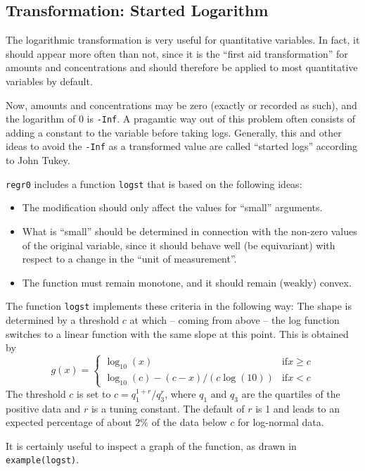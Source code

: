 \documentclass[11pt]{article}
\begin{document}
\subsection{Transformation: Started Logarithm}
The logarithmic transformation is very useful for quantitative variables. 
In fact, it should appear more often than not, since it is the
``first aid transformation'' for amounts and concentrations and should
therefore be applied to most quantitative variables by default.

Now, amounts and concentrations may be zero (exactly or recorded as such),
and the logarithm of 0 is \texttt{-Inf}. 
A pragamtic way out of this problem often consists of adding a constant
to the variable before taking logs. 
Generally, this and other ideas to avoid the \texttt{-Inf} as a transformed
value are called ``started logs'' according to John Tukey.

\texttt{regr0} includes a function \texttt{logst} that is based on the
following ideas:
\begin{itemize}
\item 
The modification should only affect the values for ``small'' arguments.
\item
What is ``small'' should be determined in connection with the non-zero 
values of the original variable, since it should behave well (be
equivariant) with respect to a change in the ``unit of measurement''.
\item
The function must remain monotone, and it should remain (weakly) convex.
\end{itemize}

The function \texttt{logst} implements these criteria in the following way: 
The shape is determined by a threshold $c$ at which -- coming from above --
the log function switches to a linear function with the same slope at this
point. This is obtained by
$$
  g(x) = \left\{\begin{array}{ll}\log_{10}(x) & \mbox{if} x\ge c\\
         \log_{10}(c) - (c-x)/(c\log(10)) & \mbox{if} x< c
         \end{array}\right.
$$
The threshold $c$ is set to
$ c = q_1^{1+r}/q_3^r$, where $q_1$ and $q_3$ are the quartiles of the 
positive data and $r$ is a tuning constant. 
The default of $r$ is 1 and leads to an expected
percentage of about 2\% of the data below $c$ for log-normal data.

It is certainly useful to inspect a graph of the function, as drawn in 
\texttt{example(logst)}.
\end{document}
